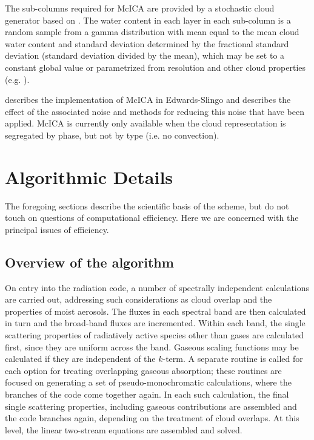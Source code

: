 \noindent
The sub-columns required for McICA are provided by a stochastic cloud 
generator based on \cite{Raisanen04}. The water content in each layer in 
each sub-column is a random sample from a gamma distribution with mean equal 
to the mean cloud water content and standard deviation determined by the 
fractional standard deviation (standard deviation divided by the mean), which 
may be set to a constant global value or parametrized from resolution and 
other cloud properties (e.g. \cite{Hill12,Boutle13}). 

\noindent
\cite{Hill11} describes the implementation of McICA in Edwards-Slingo and 
describes the effect of the associated noise and methods for reducing this 
noise that have been applied. McICA is currently only available when the cloud 
representation is segregated by phase, but not by type (i.e. no convection).

\section{Algorithmic Details}

The foregoing sections describe the scientific basis of the scheme,
but do not touch on questions of computational efficiency. Here we
are concerned with the principal issues of efficiency.

\subsection{Overview of the algorithm}

\noindent
On entry into the radiation code, a number of spectrally independent
calculations are carried out, addressing such considerations as
cloud overlap and the properties of moist aerosols. The fluxes in
each spectral band are then calculated in turn and the broad-band fluxes
are incremented. Within each band, the single scattering properties of
radiatively active species other than gases are calculated first, since
they are uniform across the band. Gaseous scaling functions may be 
calculated if they are independent of the $k$-term. A separate routine
is called for each option for treating overlapping gaseous absorption;
these routines are focused on generating a set of pseudo-monochromatic
calculations, where the branches of the code come together again. In
each such calculation, the final single scattering properties, including
gaseous contributions are assembled and the code branches again, depending
on the treatment of cloud overlaps. At this level, the linear 
two-stream equations are assembled and solved.

